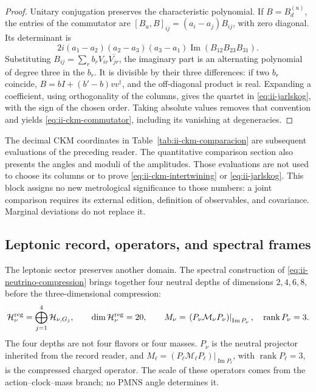 \begin{proof}
Unitary conjugation preserves the characteristic polynomial. If
\(B=B_d^{(u)}\), the entries of the commutator are
\([B_u,B]_{ij}=(a_i-a_j)B_{ij}\), with zero diagonal. Its determinant is
\[
 2i(a_1-a_2)(a_2-a_3)(a_3-a_1)
     \operatorname{Im}(B_{12}B_{23}B_{31}).
\]
Substituting \(B_{ij}=\sum_r b_rV_{ir}\overline{V_{jr}}\), the imaginary
part is an alternating polynomial of degree three in the \(b_r\).
It is divisible by their three differences: if two \(b_r\) coincide,
\(B=bI+(b'-b)vv^\dagger\), and the off-diagonal product is real.
Expanding a coefficient, using orthogonality of the columns,
gives the quartet in \eqref{eq:ii-jarlskog}, with the sign of the chosen order.
Taking absolute values removes that convention and yields
\eqref{eq:ii-ckm-commutator}, including its vanishing at degeneracies.
\end{proof}

\begin{remark}
The decimal CKM coordinates in
Table~\ref{tab:ii-ckm-comparacion} are subsequent evaluations of the
preceding reader. The quantitative comparison section also presents
the angles and moduli of the amplitudes. Those evaluations are not
used to choose its columns or to prove
\eqref{eq:ii-ckm-intertwining} or \eqref{eq:ii-jarlskog}.
This block assigns no new metrological significance to those numbers:
a joint comparison requires its external edition, definition of
observables, and covariance. Marginal deviations do not replace it.
\end{remark}

\subsection{Leptonic record, operators, and spectral frames}

The leptonic sector preserves another domain. The spectral construction of
\eqref{eq:ii-neutrino-compression} brings together four neutral depths of dimensions
\(2,4,6,8\), before the three-dimensional compression:
\begin{equation}
 \mathcal H_\nu^{\rm reg}
 =\bigoplus_{j=1}^{4}\mathcal H_{\nu,G_j},\qquad
 \dim\mathcal H_\nu^{\rm reg}=20,\qquad
 M_\nu=\left.(P_\nu\mathcal M_\nu P_\nu)\right|_{\operatorname{Im}P_\nu},
 \quad\operatorname{rank}P_\nu=3.
 \label{eq:ii-neutrino-compression}
\end{equation}
The four depths are not four flavors or four masses.
\(P_\nu\) is the neutral projector inherited from the record reader, and
\(M_\ell=\left.(P_\ell\mathcal M_\ell P_\ell)\right|_{\operatorname{Im}P_\ell}\),
with \(\operatorname{rank}P_\ell=3\), is the compressed charged operator.
The scale of these operators comes from the action--clock--mass branch;
no PMNS angle determines it.

